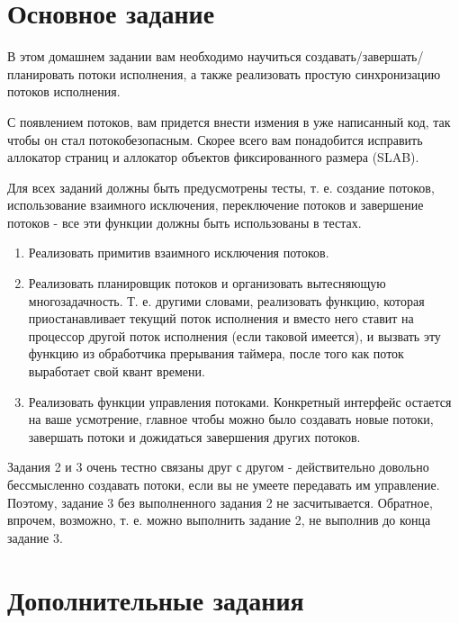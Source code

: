 \section{Основное задание}

В этом домашнем задании вам необходимо научиться создавать/завершать/планировать
потоки исполнения, а также реализовать простую синхронизацию потоков исполнения.

С появлением потоков, вам придется внести измения в уже написанный код, так
чтобы он стал потокобезопасным. Скорее всего вам понадобится исправить аллокатор
страниц и аллокатор объектов фиксированного размера (SLAB).

Для всех заданий должны быть предусмотрены тесты, т. е. создание потоков,
использование взаимного исключения, переключение потоков и завершение потоков -
все эти функции должны быть использованы в тестах.

\begin{enumerate}
  \item Реализовать примитив взаимного исключения потоков.
  \item Реализовать планировщик потоков и организовать вытесняющую
        многозадачность. Т. е. другими словами, реализовать функцию, которая
        приостанавливает текущий поток исполнения и вместо него ставит на
        процессор другой поток исполнения (если таковой имеется), и вызвать эту
        функцию из обработчика прерывания таймера, после того как поток
        выработает свой квант времени.
  \item Реализовать функции управления потоками. Конкретный интерфейс остается
        на ваше усмотрение, главное чтобы можно было создавать новые потоки,
        завершать потоки и дожидаться завершения других потоков.
\end{enumerate}

Задания 2 и 3 очень тестно связаны друг с другом - действительно довольно
бессмысленно создавать потоки, если вы не умеете передавать им управление.
Поэтому, задание 3 без выполненного задания 2 не засчитывается. Обратное,
впрочем, возможно, т. е. можно выполнить задание 2, не выполнив до конца
задание 3.

\section{Дополнительные задания}

